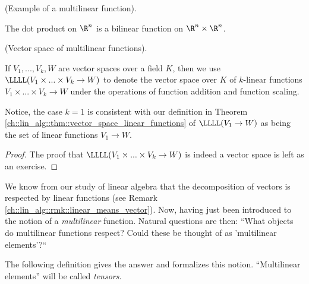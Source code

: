 \begin{example}
    (Example of a multilinear function). 
    
    The dot product on $\R^n$ is a bilinear function on $\R^n \times \R^n$.
\end{example}

\begin{defn}
    (Vector space of multilinear functions).
    
    If $V_1, ..., V_k, W$ are vector spaces over a field $K$, then we use $\LLLL(V_1 \times ... \times V_k \rightarrow W)$ to denote the vector space over $K$ of $k$-linear functions $V_1 \times ... \times V_k \rightarrow W$ under the operations of function addition and function scaling.
    
    Notice, the case $k = 1$ is consistent with our definition in Theorem \ref{ch::lin_alg::thm::vector_space_linear_functions} of $\LLLL(V_1 \rightarrow W)$ as being the set of linear functions $V_1 \rightarrow W$.
\end{defn}

\begin{proof}
     The proof that $\LLLL(V_1 \times ... \times V_k \rightarrow W)$ is indeed a vector space is left as an exercise.
\end{proof}

We know from our study of linear algebra that the decomposition of vectors is respected by linear functions (see Remark \ref{ch::lin_alg::rmk::linear_means_vector}). Now, having just been introduced to the notion of a \textit{multilinear} function. Natural questions are then: ``What objects do multilinear functions respect? Could these be thought of as 'multilinear elements'?`` 

The following definition gives the answer and formalizes this notion. ``Multilinear elements'' will be called \textit{tensors}.

\newpage

